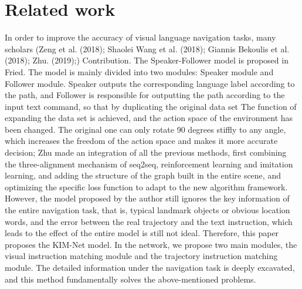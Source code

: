 \section{Related work}
In order to improve the accuracy of visual language navigation tasks, many scholars (Zeng et al. (2018); Shaolei Wang et al. (2018); Giannis Bekoulis et al. (2018); Zhu. (2019);) Contribution. The Speaker-Follower model is proposed in Fried. The model is mainly divided into two modules: Speaker module and Follower module. Speaker outputs the corresponding language label according to the path, and Follower is responsible for outputting the path according to the input text command, so that by duplicating the original data set The function of expanding the data set is achieved, and the action space of the environment has been changed. The original one can only rotate 90 degrees stiffly to any angle, which increases the freedom of the action space and makes it more accurate decision; Zhu made an integration of all the previous methods, first combining the three-alignment mechanism of seq2seq, reinforcement learning and imitation learning, and adding the structure of the graph built in the entire scene, and optimizing the specific loss function to adapt to the new algorithm framework. However, the model proposed by the author still ignores the key information of the entire navigation task, that is, typical landmark objects or obvious location words, and the error between the real trajectory and the text instruction, which leads to the effect of the entire model is still not ideal. Therefore, this paper proposes the KIM-Net model. In the network, we propose two main modules, the visual instruction matching module and the trajectory instruction matching module. The detailed information under the navigation task is deeply excavated, and this method fundamentally solves the above-mentioned problems.

